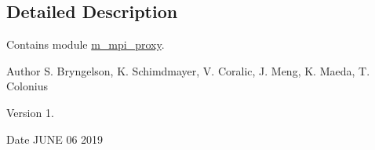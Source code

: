 \subsection{Detailed Description}
Contains module \hyperlink{namespacem__mpi__proxy}{m\+\_\+mpi\+\_\+proxy}. 

\begin{DoxyAuthor}{Author}
S. Bryngelson, K. Schimdmayer, V. Coralic, J. Meng, K. Maeda, T. Colonius 
\end{DoxyAuthor}
\begin{DoxyVersion}{Version}
1. 
\end{DoxyVersion}
\begin{DoxyDate}{Date}
J\+U\+NE 06 2019 
\end{DoxyDate}
